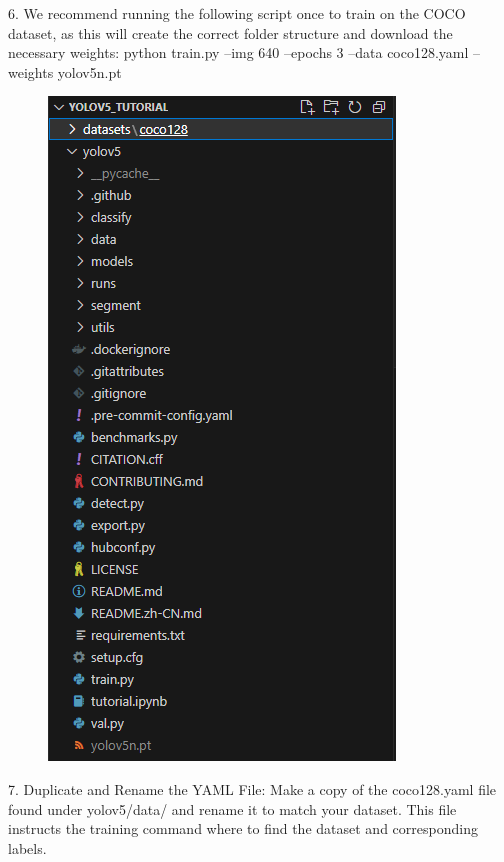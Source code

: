 6.	We recommend running the following script once to train on the COCO dataset, as this will create the correct folder structure and download the necessary weights: python train.py --img 640 --epochs 3 --data coco128.yaml --weights yolov5n.pt\\

\begin{figure}[H]
    \centering
    \includegraphics[scale=0.5]{evenbilder/tutorial/tutorial-6.png}
    \label{fig:tutorial-6}
\end{figure}

7.	Duplicate and Rename the YAML File: Make a copy of the coco128.yaml file found under yolov5/data/ and rename it to match your dataset. This file instructs the training command where to find the dataset and corresponding labels.\\

